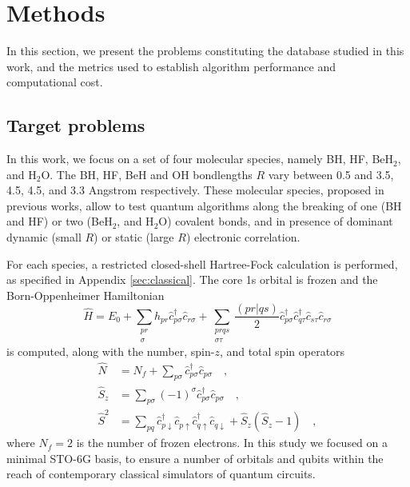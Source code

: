 \documentclass[aps,pra,onecolumn]{revtex4-2}
\newcommand{\crt}[1]{\hat{c}_{#1}^\dagger}
\newcommand{\dst}[1]{\hat{c}_{#1}^{\phantom{\dagger}}}
\begin{document}
\section{Methods}
\label{sec:methods}

In this section, we present the problems constituting the database studied in this work,
and the metrics used to establish algorithm performance and computational cost.

\subsection{Target problems}

In this work, we focus on a set of four molecular species, namely BH, HF, BeH$_2$, and H$_2$O.
The BH, HF, BeH and OH bondlengths $R$ vary between 0.5 and 3.5, 4.5, 4.5, and 3.3 Angstrom respectively.
These molecular species, proposed in previous works, allow to test quantum algorithms along the breaking of one (BH and HF) or two (BeH$_2$, and H$_2$O) covalent bonds,
and in presence of dominant dynamic (small $R$) or static (large $R$) electronic correlation.

For each species, a restricted closed-shell Hartree-Fock calculation is performed, as specified in Appendix \ref{sec:classical}.
The core 1s orbital is frozen and the Born-Oppenheimer Hamiltonian
\begin{equation}
\label{eq:hamiltonian}
\hat{H} = E_0 + \sum_{\substack{p r \\ \sigma}} h_{p r} \crt{p \sigma} \dst{r \sigma} + \sum_{\substack{p r q s \\ \sigma\tau}} \frac{(pr|qs)}{2} \crt{p \sigma} \crt{q \tau} \dst{s\tau}  \dst{r \sigma}
\end{equation}
is computed, along with the number, spin-$z$, and total spin operators
\begin{equation}
\label{eq:auxiliary}
\begin{split}
\hat{N} &= N_f + \sum_{p \sigma} \crt{p \sigma} \dst{p \sigma} \quad, \\
\hat{S}_z &= \sum_{p \sigma} (-1)^\sigma \crt{p \sigma} \dst{p \sigma} \quad, \\
\hat{S}^2 &= \sum_{pq} \crt{p\downarrow} \dst{p\uparrow} \crt{q\uparrow} \dst{q\downarrow}   + \hat{S}_z (\hat{S}_z-1) \quad,
\end{split}
\end{equation}
where $N_f = 2$ is the number of frozen electrons. 
In this study we focused on a minimal STO-6G basis, to ensure a number of orbitals and qubits within the reach of contemporary classical simulators of quantum circuits.
\end{document}
